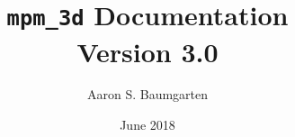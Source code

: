 \documentclass[12pt]{report}
\begin{document}
\title{\texttt{mpm\_3d} Documentation \\ \large Version 3.0}
\author{Aaron S. Baumgarten}
\date{June 2018}
\maketitle




\end{document}
